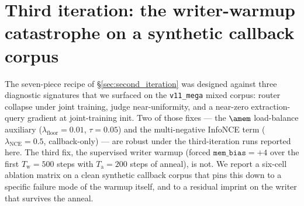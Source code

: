 %
%

\section{Third iteration: the writer-warmup catastrophe on a synthetic callback corpus}
\label{sec:third_iteration}

The seven-piece recipe of \S\ref{sec:second_iteration} was designed
against three diagnostic signatures that we surfaced on the
\texttt{v11\_mega} mixed corpus: router collapse under joint
training, judge near-uniformity, and a near-zero
extraction-query gradient at joint-training init. Two of those
fixes --- the $\amem$ load-balance auxiliary
($\lambda_{\text{floor}}{=}0.01$, $\tau{=}0.05$) and the
multi-negative InfoNCE term ($\lambda_{\text{NCE}}{=}0.5$,
callback-only) --- are robust under the third-iteration runs
reported here. The third fix, the supervised writer warmup
(forced $\texttt{mem\_bias}{=}{+4}$ over the first
$T_{\text{w}}{=}500$ steps with $T_{\text{a}}{=}200$ steps of
anneal), is not. We report a six-cell ablation matrix on a clean
synthetic callback corpus that pins this down to a specific failure
mode of the warmup itself, and to a residual imprint on the writer
that survives the anneal.

